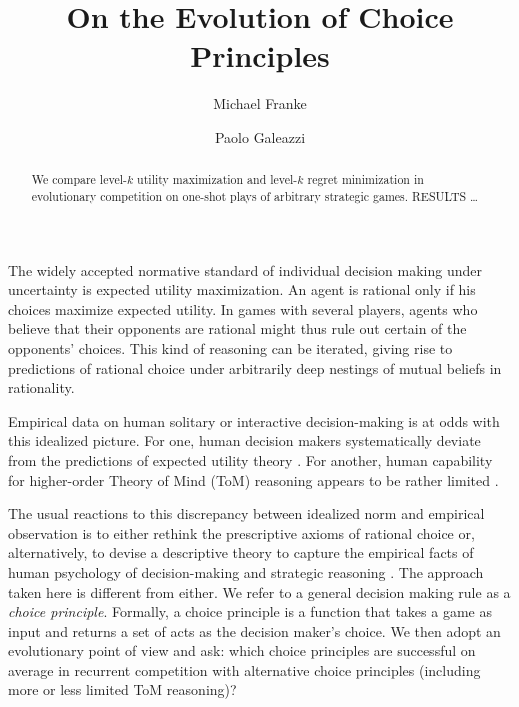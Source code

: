 \documentclass{llncs}
\title{On the Evolution of Choice Principles}
\author{Michael Franke\inst{1} \and Paolo Galeazzi \inst{2}}
\institute{Department of Linguistics, University of T\"{u}bingen \and
  Institute for Logic, Language and Computation, Universiteit van Amsterdam}
\date{}
\begin{document}
\maketitle

\begin{abstract}
  We compare level-$k$ utility maximization and level-$k$ regret
  minimization in evolutionary competition on one-shot plays of
  arbitrary strategic games. RESULTS \dots
\end{abstract}



The widely accepted normative standard of individual decision making
under uncertainty is expected utility maximization. An agent is
rational only if his choices maximize expected utility. In games with
several players, agents who believe that their opponents are rational
might thus rule out certain of the opponents' choices. This kind of
reasoning can be iterated, giving rise to predictions of rational
choice under arbitrarily deep nestings of mutual beliefs in
rationality. %

Empirical data on human solitary or interactive decision-making is at
odds with this idealized picture. For one, human decision makers
systematically deviate from the predictions of expected utility theory
\citep[e.g.][]{TverskyKahnemann1974:Judgement-under,TverskyKahnemann1981:The-Framing-of-}. For
another, human capability for higher-order Theory of Mind (ToM)
reasoning appears to be rather limited \citep[e.g.][inter
alia]{HoCamerer1998:Iterated-Domina,KeyzarLin2003:Limits-on-Theor,VerbruggeMol2008:Learning-to-App,DegenFranke2013:Cost-Based-Prag}.

The usual reactions to this discrepancy between idealized norm and
empirical observation is to either rethink the prescriptive axioms of
rational choice or, alternatively, to devise a descriptive theory to
capture the empirical facts of human psychology of decision-making and
strategic reasoning
\citep[e.g.][]{Camerer2003:Behavioral-Game,GlimcherCamerer2009:Neuroeconomics:}. The
approach taken here is different from either. We refer to a general
decision making rule as a \emph{choice principle}. Formally, a choice
principle is a function that takes a game as input and returns a set
of acts as the decision maker's choice. We then adopt an evolutionary
point of view and ask: which choice principles are successful on
average in recurrent competition with alternative choice principles
(including more or less limited ToM reasoning)?
\end{document}
